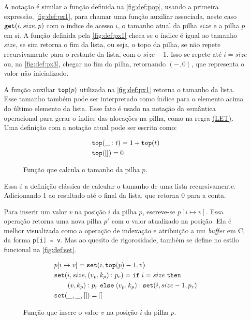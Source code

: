 A notação é similar a função definida na \autoref{fig:def:pop}, usando a primeira expressão, \autoref{fig:def:px1}, para chamar uma função auxiliar associada, neste caso $\texttt{get}(i, size, p)$ com o índice de acesso $i$, o tamanho atual da pilha $size$ e a pilha $p$ em si. A função definida pela \autoref{fig:def:px1} checa se o índice é igual ao tamanho $size$, se sim retorna o fim da lista, ou seja, o topo da pilha, se não repete recursivamente para o restante da lista, com o $size - 1$. Isso se repete até $i = size$ ou, na \autoref{fig:def:px3}, chegar no fim da pilha, retornando $(-,0)$, que representa o valor não inicializado.

A função auxiliar $\texttt{top}(p)$ utilizada na \autoref{fig:def:px1} retorna o tamanho da lista. Esse tamanho também pode ser interpretado como índice para o elemento acima do último elemento da lista. Esse fato é usado na notação da semântica operacional para gerar o índice das alocações na pilha, como na regra \hyperref[rule:let]{(LET)}. Uma definição com a notação atual pode ser escrita como:

\begin{figure}[ht]
	\begin{align}
	&\texttt{top}(\_ : t) = 1 + \texttt{top}(t) \label{fig:def:top1}\\
	&\texttt{top}([]) = 0 \label{fig:def:top2}
	\end{align}
	\caption{Função que calcula o tamanho da pilha $p$.}
	\label{fig:def:top}
\end{figure}

Essa é a definição clássica de calcular o tamanho de uma lista recursivamente. Adicionando 1 ao resultado até o final da lista, que retorna 0 para a conta.

Para inserir um valor $v$ na posição $i$ da pilha $p$, escreve-se $p[i \mapsto v]$. Essa operação retorna uma nova pilha $p'$ com o valor atualizado na posição. Ela é melhor visualizada como a operação de indexação e atribuição a um \emph{buffer} em C, da forma \lstinline[language=C]|p[i] = v|. Mas ao quesito de rigorosidade, também se define no estilo funcional na \autoref{fig:def:set}.

\begin{figure}[ht]
	\begin{align}
	&p[i \mapsto v] = \texttt{set}(i, \texttt{top}(p) - 1, v) \label{fig:def:set1}\\
	&\texttt{set}(i, size, (v_p, k_p) : p_r) = \texttt{if}\;i = size \;\texttt{then} \nonumber\\ 
	&\quad\quad(v, k_p) : p_r\;\texttt{else}\;(v_p, k_p) : \texttt{set}(i, size - 1, p_r) \label{fig:def:set2}\\
	&\texttt{set}(\_, \_, []) = [] \label{fig:def:set3}
	\end{align}
	\caption{Função que insere o valor $v$ na posição $i$ da pilha $p$.}
	\label{fig:def:set}
\end{figure}

